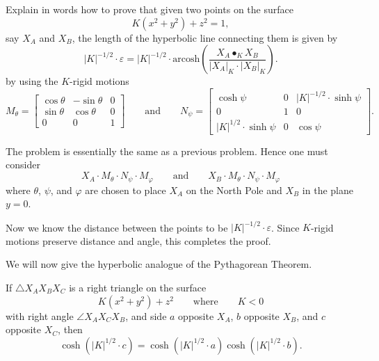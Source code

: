 \documentclass[newpage,hints,handout]{ximera}
\begin{document}
\begin{problem}
  Explain in words how to prove that given two points on the surface
  \[
  K(x^2 + y^2) + z^2 =1,
  \]
  say $X_A$ and $X_B$, the length of the hyperbolic line connecting them
  is given by
  \[
  |K|^{-1/2}\cdot \varepsilon = |K|^{-1/2} \cdot \mathrm{arcosh}
  \left(\frac{X_A\bullet_K X_B}{|X_A|_K\cdot |X_B|_K}\right).
  \]
  by using the $K$-rigid motions
  \[
   M_\theta=
  \begin{bmatrix}
    \cos\theta & -\sin\theta & 0\\
    \sin\theta & \cos\theta & 0\\
    0 & 0 & 1
  \end{bmatrix}
  \qquad\text{and}\qquad
 N_\psi=
  \begin{bmatrix}
    \cosh\psi & 0 & |K|^{-1/2}\cdot\sinh\psi\\
    0 & 1 & 0\\
    |K|^{1/2}\cdot\sinh\psi & 0 & \cos\psi
  \end{bmatrix}.
  \]
  \begin{freeResponse}
    The problem is essentially the same as a previous problem. Hence one must consider
    \[
    X_A\cdot M_\theta\cdot N_\psi\cdot M_\varphi \qquad\text{and}\qquad
    X_B\cdot M_\theta\cdot N_\psi\cdot M_\varphi
    \]
    where $\theta$, $\psi$, and $\varphi$ are chosen to place $X_A$ on
    the North Pole and $X_B$ in the plane $y=0$.

    Now we know the distance between the points to be
    $|K|^{-1/2}\cdot\varepsilon$. Since $K$-rigid motions preserve
    distance and angle, this completes the proof.
  \end{freeResponse}
\end{problem}


We will now give the hyperbolic analogue of the Pythagorean Theorem.

\begin{theorem}
  If $\triangle X_AX_BX_C$ is a right triangle on the surface
  \[
  K(x^2+y^2)+z^2\qquad\text{where}\qquad K<0
  \]
  with right angle $\angle X_AX_CX_B$, and side $a$ opposite $X_A$,
  $b$ opposite $X_B$, and $c$ opposite $X_C$, then
  \[
  \cosh\left(|K|^{1/2}\cdot c\right)=\cosh\left(|K|^{1/2}\cdot a\right)\cosh\left(|K|^{1/2}\cdot b\right).
  \]
\end{theorem}
\end{document}
